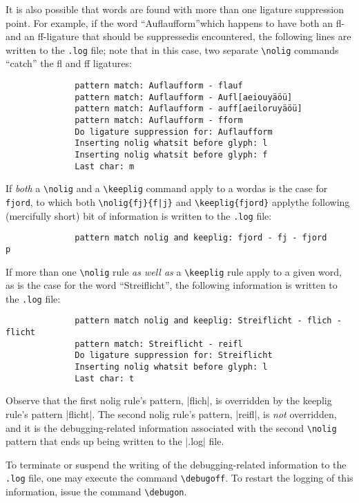 \documentclass[11pt]{article}
\newcommand{\opt}[1]{\texttt{#1}}
\newcommand{\cmmd}[1]{\texttt{\textbackslash #1}}
\begin{document}
It is also possible that words are found with more than one ligature suppression point. For example, if the word \enquote{Auflaufform}\textemdash which happens to have both an fl- and an ff-ligature that should be suppressed\textemdash is encountered, the following lines are written to the \opt{.log} file; note that in this case, two separate \cmmd{nolig} commands \enquote{catch} the fl and ff ligatures:
\begin{Verbatim}
              pattern match: Auflaufform - flauf
              pattern match: Auflaufform - Aufl[aeiouyäöü]
              pattern match: Auflaufform - auff[aeiloruyäöü]
              pattern match: Auflaufform - fform
              Do ligature suppression for: Auflaufform
              Inserting nolig whatsit before glyph: l
              Inserting nolig whatsit before glyph: f
              Last char: m
\end{Verbatim}

If \emph{both} a \cmmd{nolig} and a \cmmd{keeplig} command apply to a word\textemdash as is the case for \opt{fjord}, to which both \Verb+\nolig{fj}{f|j}+ and \Verb+\keeplig{fjord}+ apply\textemdash the following (mercifully short) bit of information is written to the \opt{.log} file:
\begin{Verbatim}
              pattern match nolig and keeplig: fjord - fj - fjord
p\end{Verbatim}

If more than one \cmmd{nolig} rule \emph{as well as} a \cmmd{keeplig} rule apply to a given word, as is the case for the word \enquote{Streiflicht}, the following information is written to the \opt{.log} file:
\begin{Verbatim}
              pattern match nolig and keeplig: Streiflicht - flich - flicht
              pattern match: Streiflicht - reifl
              Do ligature suppression for: Streiflicht
              Inserting nolig whatsit before glyph: l
              Last char: t
              \end{Verbatim}

Observe that the first nolig rule's pattern, |flich|, is overridden by the keeplig rule's pattern |flicht|. The second nolig rule's pattern, |reifl|, is \emph{not} overridden, and it is the debugging-related information associated with the second \cmmd{nolig} pattern that ends up being written to the |.log| file. 

To terminate or suspend the writing of the debugging-related information to the \opt{.log} file, one may execute the command \cmmd{debugoff}. To restart the logging of this information, issue the command \cmmd{debugon}.
\end{document}
